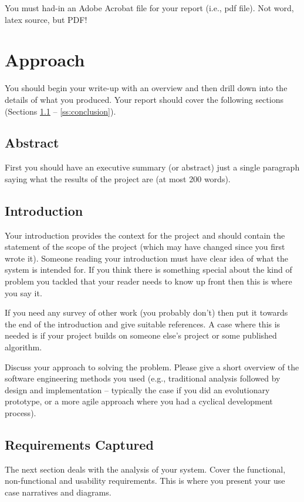 \documentclass[11pt,a4paper]{article}
\begin{document}
You must had-in an Adobe Acrobat file for your report (i.e., pdf
file). Not word, latex source, but PDF!

\section{Approach}

You should begin your write-up with an overview and then drill down
into the details of what you produced. Your report should cover the
following sections (Sections \ref{ss:introduction} --
\ref{ss:conclusion}).

\subsection*{Abstract}
First you should have an executive summary (or abstract) just a single
paragraph saying what the results of the project are (at most 200
words).

\subsection{Introduction}
\label{ss:introduction}

Your introduction provides the context for the project and should
contain the statement of the scope of the project (which may have
changed since you first wrote it). Someone reading your introduction
must have clear idea of what the system is intended for. If you think
there is something special about the kind of problem you tackled that
your reader needs to know up front then this is where you say it.

If you need any survey of other work (you probably don't) then put it
towards the end of the introduction and give suitable references. A
case where this is needed is if your project builds on someone else's
project or some published algorithm.

Discuss your approach to solving the problem. Please give a short
overview of the software engineering methods you used (e.g.,
traditional analysis followed by design and implementation -- typically
the case if you did an evolutionary prototype, or a more agile
approach where you had a cyclical development process). 

\subsection{Requirements Captured}

The next section deals with the analysis of your system. Cover the
functional, non-functional and usability requirements. This is where
you present your use case narratives and diagrams. 
\end{document}
